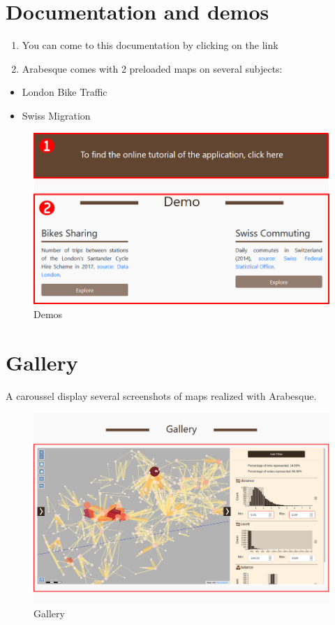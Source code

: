 \documentclass[]{book}
\providecommand{\tightlist}{%
  \setlength{\itemsep}{0pt}\setlength{\parskip}{0pt}}
\begin{document}
\hypertarget{documentation-and-demos}{%
\section{Documentation and demos}\label{documentation-and-demos}}

\begin{enumerate}
\def\labelenumi{\arabic{enumi}.}
\tightlist
\item
  You can come to this documentation by clicking on the link
\item
  Arabesque comes with 2 preloaded maps on several subjects:
\end{enumerate}

\begin{itemize}
\tightlist
\item
  London Bike Traffic
\item
  Swiss Migration
\end{itemize}

\begin{figure}
\centering
\includegraphics{images/main/03_arabesque_demos.png}
\caption{Demos}
\end{figure}

\hypertarget{gallery}{%
\section{Gallery}\label{gallery}}

A caroussel display several screenshots of maps realized with Arabesque.

\begin{figure}
\centering
\includegraphics{images/main/02_arabesque_gallery.png}
\caption{Gallery}
\end{figure}
\end{document}
